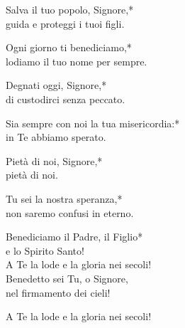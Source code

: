 \spazio

Salva il tuo popolo, Signore,*\\
guida e proteggi i tuoi figli.

\spazio

Ogni giorno ti benediciamo,*\\
lodiamo il tuo nome per sempre.

\spazio

Degnati oggi, Signore,*\\
di custodirci senza peccato.

\spazio

Sia sempre con noi la tua misericordia:*\\
in Te abbiamo sperato.

\spazio

Pietà di noi, Signore,*\\
pietà di noi.

\spazio

Tu sei la nostra speranza,*\\
non saremo confusi in eterno.

\spazio

Benediciamo il Padre, il Figlio*\\
e lo Spirito Santo!\\
A Te la lode e la gloria nei secoli!\\
Benedetto sei Tu, o Signore,\\
nel firmamento dei cieli!

\spazio

A Te la lode e la gloria nei secoli!